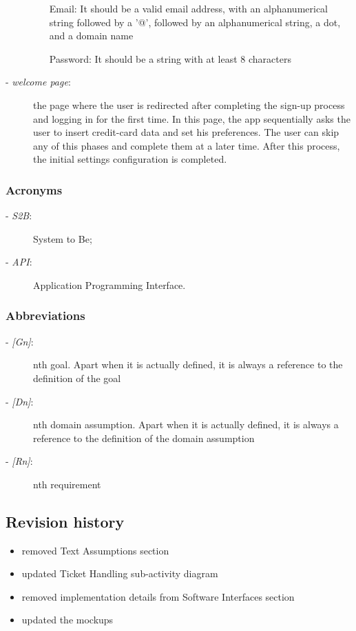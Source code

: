 \begin{description}
\begin{itemize}
				\item[Email:] It should be a valid email address, with an alphanumerical string followed by a '@', followed by an alphanumerical string, a dot, and a domain name
				\item[Password:] It should be a string with at least 8 characters
			\end{itemize}
			\item[- \textit{welcome page}:] the page where the user is redirected after completing the sign-up process and logging in for the first time. In this page, the app sequentially asks the user to insert credit-card data and set his preferences. The user can skip any of this phases and complete them at a later time. After this process, the initial settings configuration is completed.
		\end{description}
	\subsubsection{Acronyms}
		\begin{description}
		\item[- \textit{S2B}:] System to Be;
		\item[- \textit{API}:] Application Programming Interface.
	\end{description}
	\subsubsection{Abbreviations}
		\begin{description}
			\item[- \textit{[Gn]}:] nth goal. Apart when it is actually defined, it is always a reference to the definition of the goal
			\item[- \textit{[Dn]}:] nth domain assumption. Apart when it is actually defined, it is always a reference to the definition of the domain assumption
			\item[- \textit{[Rn]}:] nth requirement
		\end{description}
\subsection{Revision history}
	\begin{description}[before={\renewcommand{\makelabel}[1]{-- \textit{##1}:}}]
		\item[25 November 2017, RASDv2.0]\mbox{} %
			\begin{itemize}
				\item removed Text Assumptions section
				\item updated Ticket Handling sub-activity diagram
				\item removed implementation details from Software Interfaces section
				\item updated the mockups
			\end{itemize}
	\end{description}
